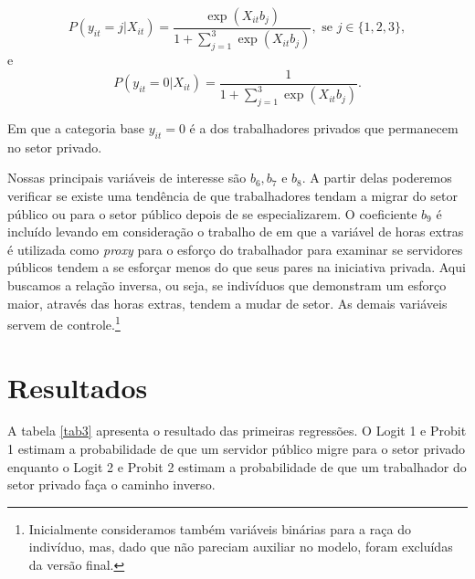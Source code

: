 \documentclass[a4paper]{article}
\begin{document}
$$ P(y_{it} = j| X_{it}) = \frac{\exp(X_{it}b_j)}{1 + \sum_{j=1}^{3}\exp(X_{it}b_j)}, \textrm{ se } j \in \{1,2,3\}, $$
e
$$ P(y_{it} = 0| X_{it}) = \frac{1}{1 + \sum_{j=1}^{3}\exp(X_{it}b_j)}. $$

Em que a categoria base $y_{it} = 0$ é a dos trabalhadores privados que permanecem no setor privado.

Nossas principais variáveis de interesse são $b_6, b_7$ e $b_8$. A partir delas poderemos verificar se existe uma tendência de que trabalhadores tendam a migrar do setor público ou para o setor público depois de se especializarem. O coeficiente $b_9$ é incluído levando em consideração o trabalho de \citet{monte2017} em que a variável de horas extras é utilizada como \textit{proxy} para o esforço do trabalhador para examinar se servidores públicos tendem a se esforçar menos do que seus pares na iniciativa privada. Aqui buscamos a relação inversa, ou seja, se indivíduos que demonstram um esforço maior, através das horas extras, tendem a mudar de setor. As demais variáveis servem de controle.\footnote{Inicialmente consideramos também variáveis binárias para a raça do indivíduo, mas, dado que não pareciam auxiliar no modelo, foram excluídas da versão final.}
 
\section{Resultados}

A tabela \ref{tab3} apresenta o resultado das primeiras regressões. O Logit 1 e Probit 1 estimam a probabilidade de que um servidor público migre para o setor privado enquanto o Logit 2 e Probit 2 estimam a probabilidade de que um trabalhador do setor privado faça o caminho inverso.
\end{document}
